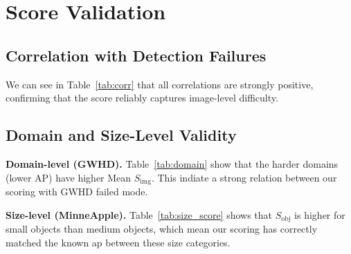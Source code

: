 \documentclass[conference]{IEEEtran}
\begin{document}
\section{Score Validation}
\label{sec:validation}

\subsection{Correlation with Detection Failures}

We can see in Table~\ref{tab:corr} that
all correlations are strongly positive, confirming
that the score reliably captures image-level difficulty.

\begin{table}[t]
\centering
\caption{Pearson correlation of $S_{\mathrm{img}}$ with per-image Miss rate and False
Positive rate}
\label{tab:corr}
\end{table}

\subsection{Domain and Size-Level Validity}


\noindent\textbf{Domain-level (GWHD).}
Table~\ref{tab:domain} show that the harder domains (lower AP) 
have higher Mean $S_{\mathrm{img}}$.
This indiate a strong relation between our scoring with GWHD failed mode.


\noindent\textbf{Size-level (MinneApple).}
Table~\ref{tab:size_score} shows that $S_{\mathrm{obj}}$ is
 higher for small objects than medium objects, which mean
our scoring has correctly
matched the known ap between these size categories.
\end{document}
